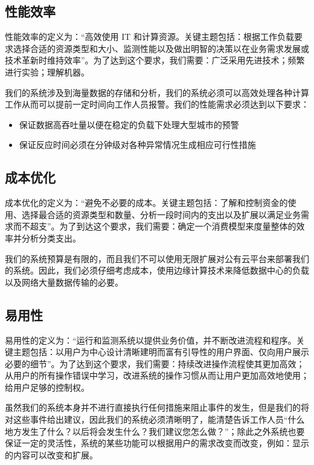 \documentclass{ctexrep}
\begin{document}
\subsection{性能效率}
性能效率的定义为：“高效使用 IT 和计算资源。关键主题包括：根据工作负载要求选择合适的资源类型和大小、监测性能以及做出明智的决策以在业务需求发展或技术革新时维持效率”。为了达到这个要求，我们需要：广泛采用先进技术；频繁进行实验；理解机器。

我们的系统涉及到海量数据的存储和分析，我们的系统必须可以高效处理各种计算工作从而可以提前一定时间向工作人员报警。我们的性能需求必须达到以下要求：
\begin{itemize}
\item 保证数据高吞吐量以便在稳定的负载下处理大型城市的预警
\item 保证反应时间必须在分钟级对各种异常情况生成相应可行性措施
\end{itemize}

\subsection{成本优化}
成本优化的定义为：“避免不必要的成本。关键主题包括：了解和控制资金的使用、选择最合适的资源类型和数量、分析一段时间内的支出以及扩展以满足业务需求而不超支”。为了到达这个要求，我们需要：确定一个消费模型来度量整体的效率并分析分类支出。

我们的系统预算是有限的，而且我们不可以使用无限扩展对公有云平台来部署我们的系统。因此，我们必须仔细考虑成本，使用边缘计算技术来降低数据中心的负载以及网络大量数据传输的必要。

\subsection{易用性}
易用性的定义为：“运行和监测系统以提供业务价值，并不断改进流程和程序。关键主题包括：以用户为中心设计清晰建明而富有引导性的用户界面、仅向用户展示必要的细节”。为了达到这个要求，我们需要：持续改进操作流程使其更加高效；从用户的所有操作错误中学习，改进系统的操作习惯从而让用户更加高效地使用；给用户足够的控制权。

虽然我们的系统本身并不进行直接执行任何措施来阻止事件的发生，但是我们的将对这些事件给出建议，因此我们的系统必须清晰明了，能清楚告诉工作人员“什么地方发生了什么？以后将会发生什么？我们建议您怎么做？”；除此之外系统也要保证一定的灵活性，系统的某些功能可以根据用户的需求改变而改变，例如：显示的内容可以改变和扩展。
\end{document}
